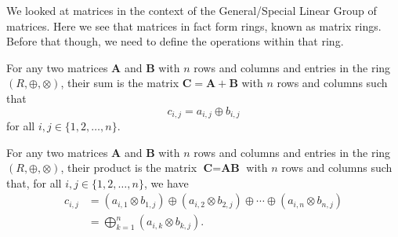 We looked at matrices in the context of the General/Special Linear Group of matrices. Here we see that matrices in fact form rings, known as matrix rings. Before that though, we need to define the operations within that ring.

\begin{definition}
    For any two matrices $\textbf{A}$ and $\textbf{B}$ with $n$ rows and columns and entries in the ring $(R, \oplus, \otimes)$, their sum is the matrix $\textbf{C} = \textbf{A} + \textbf{B}$ with $n$ rows and columns such that
    \[
        c_{i,j} = a_{i,j} \oplus b_{i,j}
    \]
    for all $i,j \in \{1, 2, \dots, n\}$.
\end{definition}
\begin{definition}
    For any two matrices $\textbf{A}$ and $\textbf{B}$ with $n$ rows and columns and entries in the ring $(R, \oplus, \otimes)$, their product is the matrix $\textbf{C} = \textbf{AB}$ with $n$ rows and columns such that, for all $i,j \in \{1, 2, \dots, n\}$, we have
    \begin{align*}
        c_{i,j} &= (a_{i,1}\otimes b_{1,j}) \oplus (a_{i,2}\otimes b_{2,j}) \oplus \cdots \oplus (a_{i,n}\otimes b_{n,j})\\
        &= \bigoplus_{k=1}^n (a_{i,k}\otimes b_{k,j}).
    \end{align*}
\end{definition}

